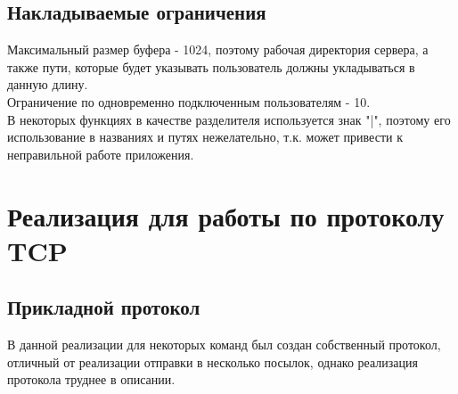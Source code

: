 \documentclass[12pt,a4paper]{report}
\begin{document}
\section{Накладываемые ограничения}
Максимальный размер буфера - 1024, поэтому рабочая директория сервера, а также пути, которые будет указывать пользователь должны укладываться в данную длину.\\
Ограничение по одновременно подключенным пользователям - 10.\\
В некоторых функциях в качестве разделителя используется знак "|", поэтому его использование в названиях и путях
нежелательно, т.к. может привести к неправильной работе приложения.\\
\chapter{Реализация для работы по протоколу TCP}
\section{Прикладной протокол}
\label{protocol_tcp}
В данной реализации для некоторых команд был создан собственный протокол,
отличный от реализации отправки в несколько посылок, однако реализация протокола труднее в описании.\\
\end{document}
